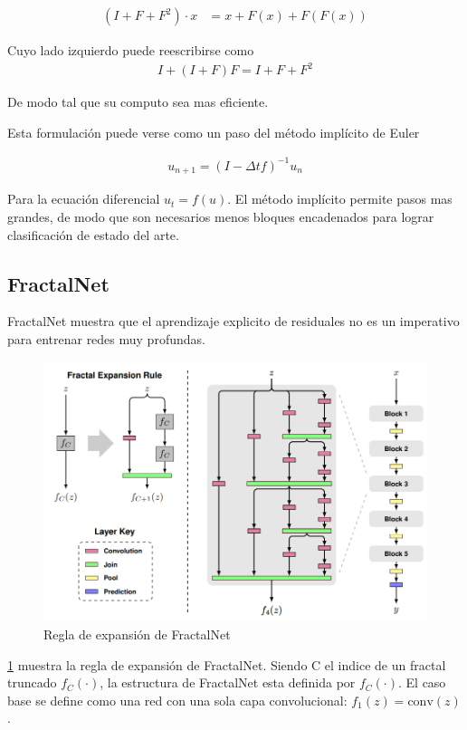 \documentclass[titlepage,a4paper,oneside]{article}
\begin{document}
\begin{align}\label{PolyNet_ODE}
	(I + F + F^2) \cdot x &= x + F(x) + F(F(x))
\end{align}

Cuyo lado izquierdo puede reescribirse como
\begin{align}
	I + (I + F) F  = I + F + F^2
\end{align}

De modo tal que su computo sea mas eficiente.

Esta formulación puede verse como un paso del método implícito de Euler

\begin{align}
	u_{n+1} = (I -\Delta tf)^{-1}u_n
\end{align}

Para la ecuación diferencial $u_t = f(u)$. El método implícito permite pasos mas grandes, de modo que son necesarios menos bloques encadenados para lograr clasificación de estado del arte.

\subsection{FractalNet}
FractalNet \cite{larsson2017fractalnet} muestra que el aprendizaje explicito de residuales no es un imperativo para entrenar redes muy profundas.

\begin{figure}[H]
\centering
\includegraphics[width=\textwidth]{images/fractal_expansion.png}
\caption{Regla de expansión de FractalNet}
\label{fractal_expansion}
\end{figure}

\ref{fractal_expansion} muestra la regla de expansión de FractalNet. Siendo C el indice de un fractal truncado $f_C(\cdot)$, la estructura de FractalNet esta definida por $f_C(\cdot)$. El caso base se define como una red con una sola capa convolucional: $f_1(z) = \text{conv}(z)$.
\end{document}
